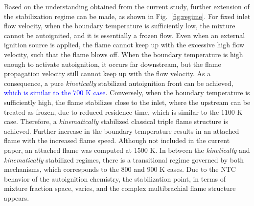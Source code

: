 \documentclass[review,3p,times]{elsarticle}
\begin{document}

Based on the understanding obtained from the current study, further extension of the stabilization regime can be made, as shown in Fig.~\ref{fig:regime}.  For fixed inlet flow velocity, when the boundary temperature is sufficiently low, the mixture cannot be autoignited, and it is essentially a frozen flow.  Even when an external ignition source is applied, the flame cannot keep up with the excessive high flow velocity, such that the flame blows off.  When the boundary temperature is high enough to activate autoignition, it occurs far downstream, but the flame propagation velocity still cannot keep up with the flow velocity.  As a consequence, a pure \emph {kinetically} stabilized autoignition front can be achieved, \textcolor{blue}{which is similar to the $700$ K case}.  Conversely, when the boundary temperature is sufficiently high, the flame stabilizes close to the inlet, where the upstream can be treated as frozen, due to reduced residence time, which is similar to the $1100$ K case.  Therefore, a \emph {kinematically} stabilized classical triple flame structure is achieved.  Further increase in the boundary temperature results in an attached flame with the increased flame speed.  Although not included in the current paper, an attached flame was computed at $1500$ K.  In between the \emph {kinetically} and \emph {kinematically} stabilized regimes, there is a transitional regime governed by both mechanisms, which corresponds to the $800$ and $900$ K cases.  Due to the NTC behavior of the autoignition chemistry, the stabilization point, in terms of mixture fraction space, varies, and the complex multibrachial flame structure appears.  
\end{document}
